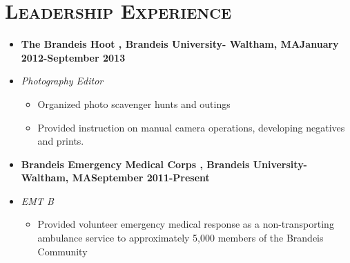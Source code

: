\documentclass[11pt, oneside]{article}
\newcommand{\lr}[2]{#1\hfill#2}
\newenvironment{ressection}[1]{
  \section{\normalsize \scshape \selectfont #1 \normalfont}
  \vspace{-4pt}
  \begin{itemize} \itemsep-2pt
}{
  \end{itemize}
  \vspace{-20pt}
}
\newenvironment{resitem}[4]{
\item[] \lr{\bfseries \selectfont #1 \normalfont, #2} {#3}
\item[] \textsl{#4}
  \vspace{-4pt}
  \begin{itemize} \itemsep-2pt
}{
  \end{itemize}
}
\begin{document}
\begin{ressection}{Leadership Experience}
  \begin{resitem}{The Brandeis Hoot}{Brandeis University- Waltham, MA}{January 2012-September 2013}{Photography Editor}
  \item Organized photo scavenger hunts and outings
  \item Provided instruction on manual camera operations, developing negatives and prints. 
  \end{resitem}
  \begin{resitem}{Brandeis Emergency Medical Corps}{Brandeis University- Waltham, MA}{September 2011-Present}{EMT B}
  \item Provided volunteer emergency medical response as a non-transporting ambulance service to approximately 5,000 members of the Brandeis Community 
  \end{resitem}
  \end{ressection}
\end{document}
